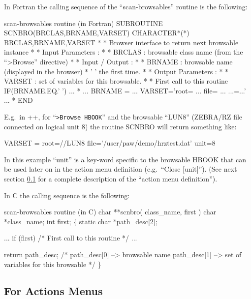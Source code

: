 \condbreak{4cm}

In Fortran the calling sequence of the ``scan-browsables'' routine 
is the following:
\begin{XMPt}{scan-browsables routine (in Fortran)}\footnotesize
      SUBROUTINE SCNBRO(BRCLAS,BRNAME,VARSET)
      CHARACTER*(*) BRCLAS,BRNAME,VARSET
*
*            Browser interface to return next browsable instance
*
*            Input Parameters  :
*
*                      BRCLAS  : browsable class name (from the ``>Browse'' directive)
*
*            Input / Output    :
*
*                      BRNAME  : browsable name (displayed in the browser)
*                                ' ' the first time.
*
*            Output Parameters :
*
*                      VARSET  : set of variables for this browsable.
*
*     First call to this routine 
      IF(BRNAME.EQ.' ') ...
*
      ... 
\vspace{-\baselineskip}
      BRNAME = ...
      VARSET='root= ... file= ... ...=...'
      ...
*
      END
\end{XMPt}
E.g.\ in \PAW++{}, for ``{\tt >Browse HBOOK}'' and the browsable ``LUN8'' (ZEBRA/RZ
file connected on logical unit 8) the routine SCNBRO will return something
like:
\begin{XMP}
VARSET = root=//LUN8 file='/user/paw/demo/hrztest.dat'  unit=8
\end{XMP}
In this example ``unit'' is a key-word specific to the browsable HBOOK that 
can be used later on in the action menu definition (e.g.\ ``Close [unit]'').
(See next section \ref{ref:recdfacm} for a complete description of the 
``action menu definition'').

\condbreak{4cm}
In C the calling sequence is the following:
\begin{XMPt} {scan-browsables routine (in C)}
char **scnbro( class_name, first )
     char *class_name;
     int first;
\{
    static char *path_desc[2];

    ...
    if (first) {
       /* First call to this routine */
    }
    ...

    return path_desc;  /* path_desc[0] --> browsable name
                          path_desc[1] --> set of variables for this browsable
                        */
\}
\end{XMPt}

\subsection{For Actions Menus}
\label{ref:recdfacm}

